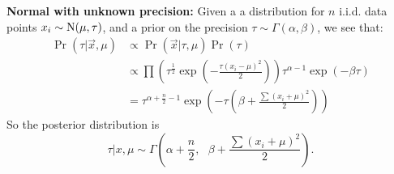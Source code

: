 \documentclass[thesis.tex]{subfiles}
\begin{document}
\bigskip

\noindent\textbf{Normal with unknown precision:} Given a a distribution for $n$ i.i.d. data points $x_i \sim \operatorname{N}(\mu, \tau)$, and a prior on the precision $\tau \sim \Gamma(\alpha, \beta)$, we see that: \begin{align*}
\Pr(\tau | \vec{x}, \mu) &\propto \Pr(\vec{x} | \tau, \mu)\Pr(\tau) \\
&\propto \prod\left(\tau^{\frac{1}{2}}\exp\left(  -\frac{\tau(x_i - \mu)^2}{2}  \right)\right) \tau^{\alpha-1}\exp(-\beta\tau) \\
&= \tau^{\alpha + \frac{n}{2} - 1}\exp\left(  -\tau\left(\beta + \frac{\sum(x_i + \mu)^2}{2}\right)  \right)
\end{align*}
So the posterior distribution is \[
\tau | x, \mu \sim \Gamma\left(  \alpha + \frac{n}{2}, \text{ } \beta + \frac{\sum(x_i + \mu)^2}{2}  \right).
\]
\end{document}
